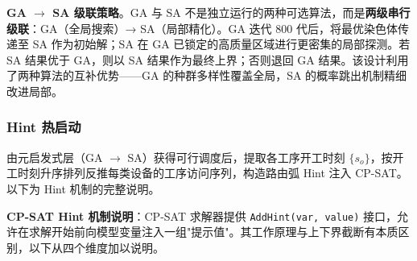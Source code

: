 \documentclass[12pt,a4paper]{ctexart}
\begin{document}
\medskip
\noindent\textbf{GA $\rightarrow$ SA 级联策略}。GA 与 SA 不是独立运行的两种可选算法，而是\textbf{两级串行级联}：GA（全局搜索）→ SA（局部精化）。GA 迭代 800 代后，将最优染色体传递至 SA 作为初始解；SA 在 GA 已锁定的高质量区域进行更密集的局部探测。若 SA 结果优于 GA，则以 SA 结果作为最终上界；否则退回 GA 结果。该设计利用了两种算法的互补优势——GA 的种群多样性覆盖全局，SA 的概率跳出机制精细改进局部。

\subsubsection{Hint 热启动}
由元启发式层（GA $\rightarrow$ SA）获得可行调度后，提取各工序开工时刻 $\{s_o\}$，按开工时刻升序排列反推每类设备的工序访问序列，构造路由弧 Hint 注入 CP-SAT。以下为 Hint 机制的完整说明。

\medskip
\noindent\textbf{CP-SAT Hint 机制说明}：CP-SAT 求解器提供 \texttt{AddHint(var, value)} 接口，允许在求解开始前向模型变量注入一组"提示值"。其工作原理与上下界截断有本质区别，以下从四个维度加以说明。
\end{document}
